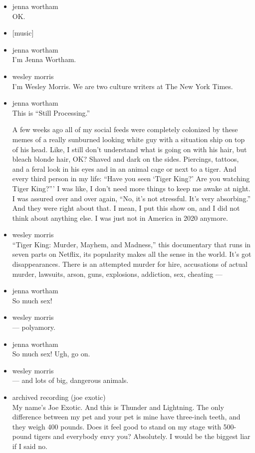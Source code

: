 \begin{itemize}
\item
  jenna wortham\\
  OK.
\item
  {[}music{]}
\item
  jenna wortham\\
  I'm Jenna Wortham.
\item
  wesley morris\\
  I'm Wesley Morris. We are two culture writers at The New York Times.
\item
  jenna wortham\\
  This is ``Still Processing.''

  A few weeks ago all of my social feeds were completely colonized by
  these memes of a really sunburned looking white guy with a situation
  ship on top of his head. Like, I still don't understand what is going
  on with his hair, but bleach blonde hair, OK? Shaved and dark on the
  sides. Piercings, tattoos, and a feral look in his eyes and in an
  animal cage or next to a tiger. And every third person in my life:
  ``Have you seen `Tiger King?' Are you watching Tiger King?''' I was
  like, I don't need more things to keep me awake at night. I was
  assured over and over again, ``No, it's not stressful. It's very
  absorbing.'' And they were right about that. I mean, I put this show
  on, and I did not think about anything else. I was just not in America
  in 2020 anymore.
\item
  wesley morris\\
  ``Tiger King: Murder, Mayhem, and Madness,'' this documentary that
  runs in seven parts on Netflix, its popularity makes all the sense in
  the world. It's got disappearances. There is an attempted murder for
  hire, accusations of actual murder, lawsuits, arson, guns, explosions,
  addiction, sex, cheating ---
\item
  jenna wortham\\
  So much sex!
\item
  wesley morris\\
  --- polyamory.
\item
  jenna wortham\\
  So much sex! Ugh, go on.
\item
  wesley morris\\
  --- and lots of big, dangerous animals.
\item
  archived recording (joe exotic)\\
  My name's Joe Exotic. And this is Thunder and Lightning. The only
  difference between my pet and your pet is mine have three-inch teeth,
  and they weigh 400 pounds. Does it feel good to stand on my stage with
  500-pound tigers and everybody envy you? Absolutely. I would be the
  biggest liar if I said no.
\end{itemize}

